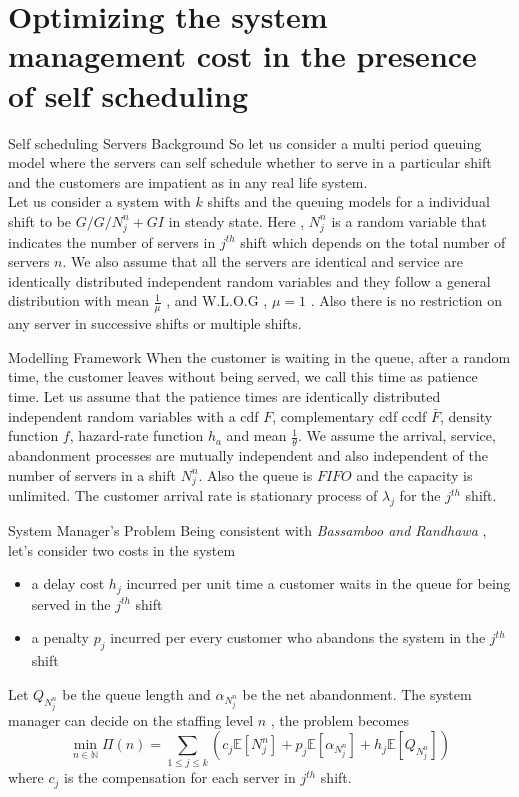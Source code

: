 \documentclass[9pt]{beamer}
\begin{document}
\section{Optimizing the system management cost in the presence of self scheduling }
\begin{frame}{Self scheduling Servers Background}
    So let us consider a multi period queuing model where the servers can self schedule whether to serve in a particular shift and the customers are impatient as in any real life system. \bigskip \\
    
    Let us consider a system with $k$ shifts and the queuing models for a individual shift to be 
$G/G/N_{j}^{n} +GI$ in steady state. Here , $N_{j}^{n}$ is a random variable that indicates the number of servers in $j^{th}$ shift which depends on the total number of servers $n$. We also assume that all the servers are identical and service are identically distributed independent random variables and they follow a general distribution with mean $\frac{1}{\mu}$ , and W.L.O.G , $\mu=1$ . Also there is no restriction on any server in successive shifts or multiple shifts.
\end{frame}
\begin{frame}{Modelling Framework}
    When the customer is waiting in the queue, after a random time, the customer leaves without being served, we call this time as patience time. Let us assume that the patience times are identically distributed independent random variables with a cdf $F$, complementary cdf ccdf $\bar{F}$, density function $f$, hazard-rate function $h_{a}$ and mean $\frac{1}{\theta}$. We assume the arrival, service, abandonment processes are mutually independent and also independent of the number of servers in a shift $N_{j}^{n}$. Also the queue is $FIFO$ and the capacity is unlimited. The customer arrival rate is stationary process of $\lambda_j$ for the $j^{th}$ shift.
\end{frame}
\begin{frame}{System Manager's Problem}
Being consistent with \textit{Bassamboo and Randhawa} , let's consider two costs in the system 
 \begin{itemize}
    \item a delay cost ${h_{j}}$ incurred per unit time a customer waits in the queue for being served in the $j^{th}$ shift
    \item a penalty ${p_{j}}$ incurred per every customer who abandons the system in the $j^{th}$ shift
\end{itemize}
Let $Q_{N_{j}^{n}}$ be the queue length and $\alpha_{N_{j}^{n}}$ be the net abandonment. The system manager can decide on the staffing level $n$ , the problem becomes
\begin{equation}
   \min_{n \in \mathbb{N}} \Pi(n) = \sum_{1 \leq j \leq k} ({c_{j}\mathbb{E}[N_{j}^{n}]+p_{j}\mathbb{E}[\alpha_{N_{j}^{n}}]}+h_{j}\mathbb{E}[Q_{N_{j}^{n}}])   
\end{equation}
where $c_j$ is the compensation for each server in $j^{th}$ shift.
\end{frame}
\end{document}
